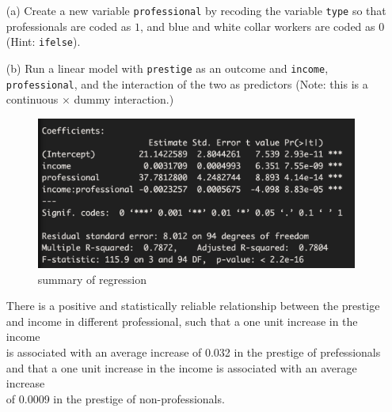 \documentclass[12pt,letterpaper]{article}
\begin{document}
\newpage
\begin{enumerate}
	
	\item [(a)]
	Create a new variable \texttt{professional} by recoding the variable \texttt{type} so that professionals are coded as $1$, and blue and white collar workers are coded as $0$ (Hint: \texttt{ifelse}).
	  
	\vspace{6cm}
	
	
	\item [(b)]
	Run a linear model with \texttt{prestige} as an outcome and \texttt{income}, \texttt{professional}, and the interaction of the two as predictors (Note: this is a continuous $\times$ dummy interaction.)
	  
	\begin{figure}[h!]\centering
		\caption{\footnotesize summary of regression}
		\label{regression.png}
		\includegraphics[width=.85\textwidth]{regression.png}
	\end{figure}
		\vspace{3cm}
		\begin{itemize}
		There is a positive and statistically reliable relationship between the prestige \\
		and income in different professional, such that a one unit increase in the income\\
		 is associated with an average increase of 0.032 in the prestige of prefessionals \\
		 and that a one unit increase in the income is associated with an average increase\\
		 of 0.0009 in the prestige of non-professionals.  \\
		 \end{itemize}
	

\end{enumerate}
\end{document}
